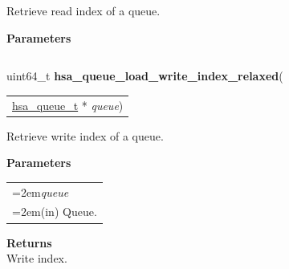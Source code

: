\documentclass[final]{book}
\newcommand{\hsaarg}[1]{\textit{#1}}
\begin{document}
\begin{appendices}
\noindent{}
Retrieve read index of a queue.

\noindent\textbf{Parameters}\\[-6mm]
\noindent\begin{longtable}{@{}>{\hangindent=2em}p{\textwidth}}
\hsaarg{queue}\\\hspace{2em}(in) Queue.
\end{longtable}
\vspace{-5mm}\noindent\textbf{Returns}\\[1mm]
Read index.

\noindent\begin{longtable}{@{}>{\hangindent=2em}p{\linewidth}}

\end{longtable}
 


\noindent\begin{tcolorbox}[breakable,nobeforeafter,colframe=white,colback=lightgray,left=0mm]
uint64_t \hypertarget{group--queue-1ga2f31d20692bb769f3b1dfaea115ffd92}{\textbf{hsa_queue_load_write_index_relaxed}}(
\vspace{-3.5mm}\begin{longtable}{@{}p{\textwidth}}
\hspace{1.7em}\hyperlink{group--queue-1gacbb2835331f18aee30ee441f07b3fc5a}{hsa_queue_t} * \hsaarg{queue})\end{longtable}

\end{tcolorbox}
Retrieve write index of a queue.

\noindent\textbf{Parameters}\\[-6mm]
\noindent\begin{longtable}{@{}>{\hangindent=2em}p{\textwidth}}
\hsaarg{queue}\\\hspace{2em}(in) Queue.
\end{longtable}
\vspace{-5mm}\noindent\textbf{Returns}\\[1mm]
Write index.


\end{appendices}
\end{document}
